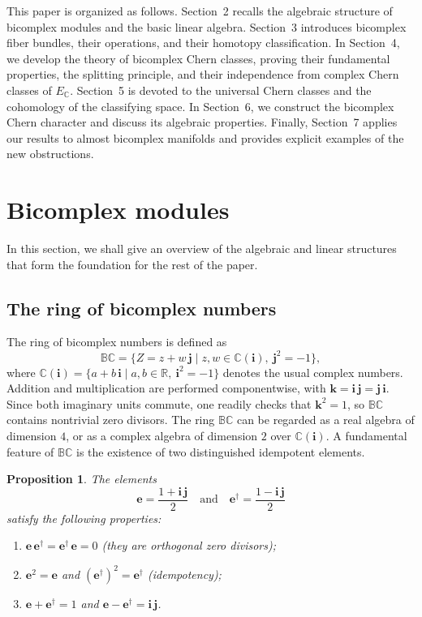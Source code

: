 \documentclass[11pt]{amsart}
\newcommand{\BC}{\mathbb{BC}}       %
\newcommand{\C}{\mathbb{C}}          %
\newcommand{\R}{\mathbb{R}}
\newcommand{\e}{\mathbf{e}}          %
\newcommand{\ed}{\mathbf{e}^\dagger} %
\newcommand{\iunit}{\mathbf{i}}      %
\newcommand{\junit}{\mathbf{j}}      %
\newcommand{\kunit}{\mathbf{k}}      %
\newtheorem{prop}{Proposition}[section]   %
\theoremstyle{definition}
\begin{document}
This paper is organized as follows. Section~2 recalls the algebraic
structure of bicomplex modules and the basic linear algebra.
Section~3 introduces bicomplex fiber bundles, their operations, and
their homotopy classification. In Section~4, we develop the theory of
bicomplex Chern classes, proving their fundamental properties, the
splitting principle, and their independence from complex Chern classes of $E_\C$.
Section~5 is devoted to the universal Chern classes and the cohomology
of the classifying space. In Section~6, we construct the bicomplex
Chern character and discuss its algebraic properties. Finally,
Section~7 applies our results to almost bicomplex manifolds and
provides explicit examples of the new obstructions.

\section{Bicomplex modules}\label{sec:bicomplex-modules}
In this section, we shall give an overview of the algebraic and linear structures that form the foundation for the rest of the paper.
\subsection{The ring of bicomplex numbers}

The ring of bicomplex numbers is defined as
\begin{equation*}
    \BC = \{ Z = z + w\,\junit \mid z,w \in \C(\iunit),\ \junit^2 = -1 \},
\end{equation*}
where $\C(\iunit) = \{ a + b\,\iunit \mid a,b \in \R,\ \iunit^2 = -1 \}$ denotes the usual complex numbers. Addition and multiplication are performed componentwise, with $\kunit = \iunit\,\junit = \junit\,\iunit$. Since both imaginary units commute, one readily checks that $\kunit^2 = 1$, so $\BC$ contains nontrivial zero divisors. The ring $\BC$ can be regarded as a real algebra of dimension $4$, or as a complex algebra of dimension $2$ over $\C(\iunit)$. A fundamental feature of $\BC$ is the existence of two distinguished idempotent elements.

\begin{prop}
    The elements
    \begin{equation*}
        \e = \frac{1 + \iunit\,\junit}{2} \quad \text{and} \quad
        \ed = \frac{1 - \iunit\,\junit}{2}
    \end{equation*}
    satisfy the following properties:
    \begin{enumerate}
        \item $\e\,\ed = \ed\,\e = 0$ (they are orthogonal zero divisors);
        \item $\e^2 = \e$ and $(\ed)^2 = \ed$ (idempotency);
        \item $\e + \ed = 1$ and $\e - \ed = \iunit\,\junit$.
    \end{enumerate}
\end{prop}
\end{document}
